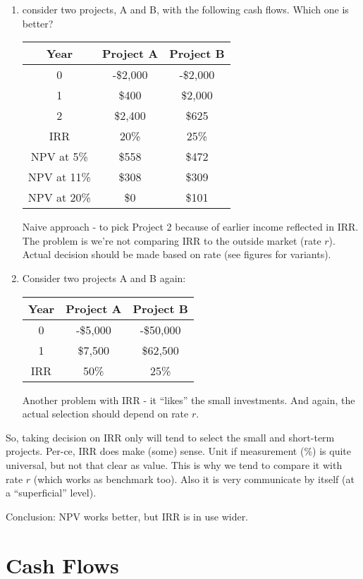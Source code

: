 \documentclass{scrartcl}
\begin{document}
\begin{enumerate}
\item consider two projects, A and B, with the following cash flows. Which one
  is better?
  \begin{tabular}{|c|c|c|}
    Year & Project A & Project B \\
    \hline
    0 & -\$2,000 & -\$2,000 \\
    1 & \$400 & \$2,000 \\
    2 & \$2,400 & \$625 \\
    \hline
    IRR & 20\%  & 25\% \\
    NPV at 5\% & \$558  & \$472  \\
    NPV at 11\% & \$308    & \$309  \\
    NPV at 20\% & \$0   & \$101  \\
  \end{tabular}

  Naive approach - to pick Project 2 because of earlier income reflected in IRR.
  The problem is we're not comparing IRR to the outside market (rate $r$).
  Actual decision should be made based on rate (see figures for variants).

\item Consider two projects A and B again:
  \begin{tabular}{|c|c|c|}
    Year & Project A & Project B \\
    \hline
    0 & -\$5,000 & -\$50,000 \\
    1 & \$7,500 & \$62,500 \\
    \hline
    IRR & 50\%  & 25\% \\
  \end{tabular}

  Another problem with IRR - it ``likes'' the small investments. And again, the
  actual selection should depend on rate $r$.
\end{enumerate}

So, taking decision on IRR only will tend to select the small and short-term
projects.
Per-ce, IRR does make (some) sense. Unit if measurement (\%) is quite universal,
but not that clear as value. This is why we tend to compare it with rate $r$
(which works as benchmark too). Also it is very communicate by itself (at a
``superficial'' level).

Conclusion: NPV works better, but IRR is in use wider.

\section{Cash Flows}
\label{sec:Cashflow}
\end{document}
